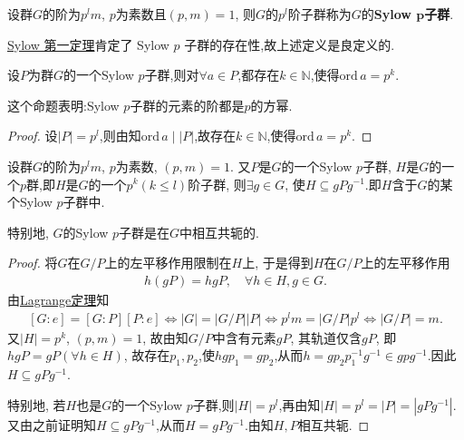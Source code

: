 \documentclass[../../main.tex]{subfiles}%
\begin{document}
\begin{definition}[Sylow $p$子群]
设群$G$的阶为$p^lm$, $p$为素数且$(p,m)=1$, 则$G$的$p^l$阶子群称为$G$的\textbf{Sylow $\boldsymbol{p}$子群}.
\end{definition}
\begin{remark}
\hyperref[theorem:Sylow 第一定理]{Sylow 第一定理}肯定了 Sylow $p$ 子群的存在性,故上述定义是良定义的.
\end{remark}

\begin{proposition}\label{theorem:Sylow p群中元素的阶}
设$P$为群$G$的一个Sylow $p$子群,则对$\forall a\in P$,都存在$k\in \mathbb{N}$,使得$\mathrm{ord}\,a = p^k.$
\end{proposition}
\begin{remark}
这个命题表明:Sylow $p$子群的元素的阶都是$p$的方幂.
\end{remark}
\begin{proof}
设$|P|=p^l$,则由知$\mathrm{ord}\,a \mid |P|$,故存在$k\in \mathbb{N}$,使得$\mathrm{ord}\,a = p^k.$
\end{proof}

\begin{theorem}\label{theorem:Sylow 第二定理}
设群$G$的阶为$p^lm$, $p$为素数, $(p,m)=1$. 又$P$是$G$的一个Sylow $p$子群, $H$是$G$的一个$p$群,即$H$是$G$的一个$p^k(k\leqslant l)$阶子群, 则$\exists g\in G$, 使$H\subseteq gPg^{-1}$.即$H$含于$G$的某个Sylow $p$子群中.

特别地, $G$的Sylow $p$子群是在$G$中相互共轭的.
\end{theorem}
\begin{proof}
将$G$在$G/P$上的左平移作用限制在$H$上, 于是得到$H$在$G/P$上的左平移作用
\begin{align*}
h(gP)=hgP, \quad \forall h\in H, g\in G.
\end{align*}
由\hyperref[theorem:抽象代数--Lagrange定理]{Lagrange定理}知
\begin{align*}
\left[ G:e \right] =\left[ G:P \right] \left[ P:e \right] \Longleftrightarrow \left| G \right|=\left| G/P \right|\left| P \right|\Longleftrightarrow p^lm=\left| G/P \right|p^l\Longleftrightarrow \left| G/P \right|=m.
\end{align*}
又$|H|=p^k$, $(p,m)=1$, 故由知$G/P$中含有元素$gP$, 其轨道仅含$gP$, 即$hgP=gP(\forall h\in H)$, 故存在$p_1,p_2$,使$hgp_1=gp_2$,从而$h=gp_2p_1^{-1}g^{-1}\in gpg^{-1}$.因此$H\subseteq gPg^{-1}$.

特别地, 若$H$也是$G$的一个Sylow $p$子群,则$|H|=p^l$,再由知$|H|=p^l=|P|=|gPg^{-1}|$. 又由之前证明知$H\subseteq gPg^{-1}$,从而$H=gPg^{-1}$.由知$H,P$相互共轭.
\end{proof}
\end{document}
